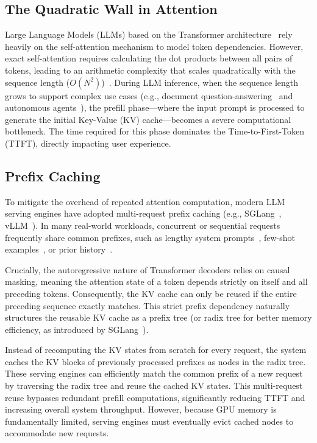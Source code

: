 \documentclass[letterpaper,twocolumn,10pt]{article}
\begin{document}
\subsection{The Quadratic Wall in Attention}
Large Language Models (LLMs) based on the Transformer
architecture~\cite{vaswani2017attention} rely
heavily on the self-attention mechanism to model token dependencies.
However, exact self-attention requires calculating the dot products between
all pairs of tokens, leading to an arithmetic complexity that scales
quadratically with the sequence length ($O(N^2)$)~\cite{kaplan2020scaling}.
During LLM inference, when the sequence length grows to support complex
use cases (e.g., document question-answering~\cite{bai2024longbench,liu2024lost}
and autonomous agents~\cite{yao2023react,park2023generative}), the
prefill phase---where the input prompt is processed to generate the initial
Key-Value (KV) cache---becomes a severe computational bottleneck.
The time required for this phase dominates the Time-to-First-Token (TTFT),
directly impacting user experience.

\subsection{Prefix Caching}
%

To mitigate the overhead of repeated attention computation, modern LLM serving
engines have adopted multi-request prefix caching (e.g.,
SGLang~\cite{zheng2024sglang}, vLLM~\cite{kwon2023efficient}).
In many real-world workloads, concurrent or sequential requests frequently share
common prefixes, such as lengthy system prompts~\cite{park2023generative}, few-shot
examples~\cite{brown2020language}, or prior history~\cite{yao2023react}.

Crucially, the autoregressive nature of Transformer decoders relies on causal
masking, meaning the attention state of a token depends strictly on itself and
all preceding tokens. Consequently, the KV cache can only be reused if the
entire preceding sequence exactly matches. This strict prefix dependency naturally
structures the reusable KV cache as a prefix tree (or radix tree for better memory
efficiency, as introduced by SGLang~\cite{zheng2024sglang}).

Instead of recomputing the KV states from scratch for every
request, the system caches the KV blocks of previously processed prefixes as
nodes in the radix tree. These serving engines can efficiently match
the common prefix of a new request by traversing the radix tree and reuse the cached KV states. This
multi-request reuse bypasses redundant prefill computations, significantly
reducing TTFT and increasing overall system throughput. However, because GPU
memory is fundamentally limited, serving engines must eventually evict cached nodes
to accommodate new requests.
\end{document}
